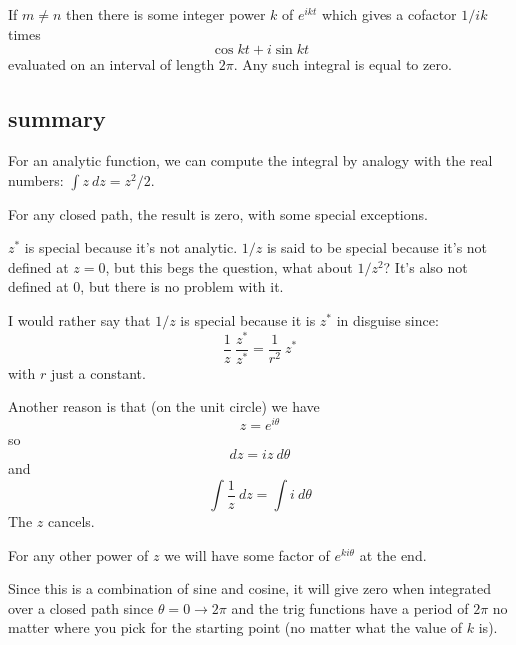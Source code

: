 \documentclass[11pt, oneside]{article}
\begin{document}
If $m \ne n$ then there is some integer power $k$ of $e^{ikt}$ which gives a cofactor $1/ik$ times 
\[ \cos kt + i \sin kt \]
evaluated on an interval of length $2 \pi$.  Any such integral is equal to zero.

\subsection*{summary}

For an analytic function, we can compute the integral by analogy with the real numbers:  $\int z \ dz = z^2/2$.

For any closed path, the result is zero, with some special exceptions.

$z^*$ is special because it's not analytic.  $1/z$ is said to be special because it's not defined at $z = 0$, but this begs the question, what about $1/z^2$?  It's also not defined at $0$, but there is no problem with it.

I would rather say that $1/z$ is special because it is $z^*$ in disguise since:
\[ \frac{1}{z} \ \frac{z^*}{z^*} = \frac{1}{r^2} \ z^* \]
with $r$ just a constant.

Another reason is that (on the unit circle) we have
\[ z = e^{i \theta} \]
so
\[ dz = i z \ d \theta \]
and
\[ \int \frac{1}{z} \ dz = \int i \ d \theta \]
The $z$ cancels.

For any other power of $z$ we will have some factor of $e^{ki\theta}$ at the end.  

Since this is a combination of sine and cosine, it will give zero when integrated over a closed path since $\theta = 0 \rightarrow 2 \pi$ and the trig functions have a period of $2 \pi$ no matter where you pick for the starting point (no matter what the value of $k$ is).
\end{document}
